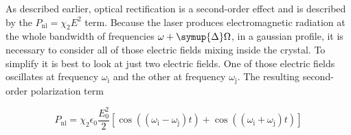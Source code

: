 As described earlier, optical rectification is a second-order effect and is described by the $P_\text{nl} = \chi_2 E^2$ term.
Because the laser produces electromagnetic radiation at the whole bandwidth of frequencies $\omega + \symup{\Delta}\Omega$, in a gaussian profile, it is necessary to consider all of those electric fields mixing inside the crystal.
To simplify it is best to look at just two electric fields.
One of those electric fields oscillates at frequency $\omega_\text{i}$ and the other at frequency $\omega_\text{j}$.
The resulting second-order polarization term 

\begin{equation}
    P_\text{nl} = \chi_2 \epsilon_0 \frac{E_0^2}{2}\left[\cos((\omega_\text{i} - \omega_\text{j})t) + \cos((\omega_\text{i} + \omega_\text{j})t)\right]
\label{eq:two_freq_mixing}
\end{equation}

